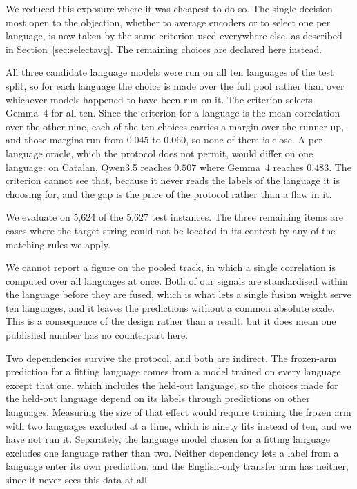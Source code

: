 We reduced this exposure where it was cheapest to do so. The single
decision most open to the objection, whether to average encoders or to
select one per language, is now taken by the same criterion used
everywhere else, as described in Section~\ref{sec:selectavg}. The
remaining choices are declared here instead.

All three candidate language models were run on all ten languages of
the test split, so for each language the choice is made over the full
pool rather than over whichever models happened to have been run on it.
The criterion selects Gemma~4 for all ten. Since the criterion for a
language is the mean correlation over the other nine, each of the ten
choices carries a margin over the runner-up, and those margins run from
$0.045$ to $0.060$, so none of them is close. A per-language oracle,
which the protocol does not permit, would differ on one language: on
Catalan, Qwen3.5 reaches $0.507$ where Gemma~4 reaches $0.483$. The
criterion cannot see that, because it never reads the labels of the
language it is choosing for, and the gap is the price of the protocol
rather than a flaw in it.

We evaluate on 5{,}624 of the 5{,}627 test instances. The three
remaining items are cases where the target string could not be located
in its context by any of the matching rules we apply.

We cannot report a figure on the pooled track, in which a single
correlation is computed over all languages at once. Both of our signals
are standardised within the language before they are fused, which is
what lets a single fusion weight serve ten languages, and it leaves the
predictions without a common absolute scale. This is a consequence of
the design rather than a result, but it does mean one published number
has no counterpart here.

Two dependencies survive the protocol, and both are indirect. The
frozen-arm prediction for a fitting language comes from a model trained
on every language except that one, which includes the held-out language,
so the choices made for the held-out language depend on its labels
through predictions on other languages. Measuring the size of that
effect would require training the frozen arm with two languages excluded
at a time, which is ninety fits instead of ten, and we have not run it.
Separately, the language model chosen for a fitting language excludes
one language rather than two. Neither dependency lets a label from a
language enter its own prediction, and the English-only transfer arm has
neither, since it never sees this data at all.





